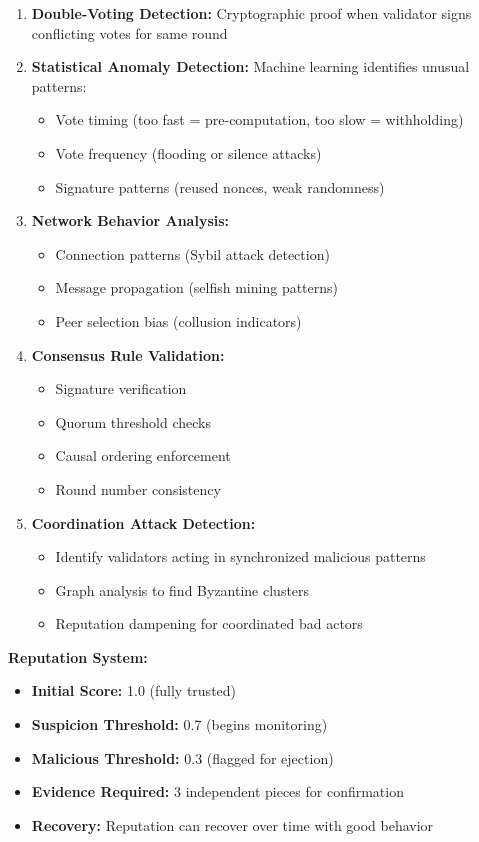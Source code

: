 \documentclass[11pt,a4paper]{article}
\begin{document}
\begin{enumerate}[leftmargin=*]
\item \textbf{Double-Voting Detection:} Cryptographic proof when validator signs conflicting votes for same round

\item \textbf{Statistical Anomaly Detection:} Machine learning identifies unusual patterns:
\begin{itemize}
    \item Vote timing (too fast = pre-computation, too slow = withholding)
    \item Vote frequency (flooding or silence attacks)
    \item Signature patterns (reused nonces, weak randomness)
\end{itemize}

\item \textbf{Network Behavior Analysis:}
\begin{itemize}
    \item Connection patterns (Sybil attack detection)
    \item Message propagation (selfish mining patterns)
    \item Peer selection bias (collusion indicators)
\end{itemize}

\item \textbf{Consensus Rule Validation:}
\begin{itemize}
    \item Signature verification
    \item Quorum threshold checks
    \item Causal ordering enforcement
    \item Round number consistency
\end{itemize}

\item \textbf{Coordination Attack Detection:}
\begin{itemize}
    \item Identify validators acting in synchronized malicious patterns
    \item Graph analysis to find Byzantine clusters
    \item Reputation dampening for coordinated bad actors
\end{itemize}
\end{enumerate}

\textbf{Reputation System:}
\begin{itemize}[leftmargin=*]
\item \textbf{Initial Score:} 1.0 (fully trusted)
\item \textbf{Suspicion Threshold:} 0.7 (begins monitoring)
\item \textbf{Malicious Threshold:} 0.3 (flagged for ejection)
\item \textbf{Evidence Required:} 3 independent pieces for confirmation
\item \textbf{Recovery:} Reputation can recover over time with good behavior
\end{itemize}
\end{document}
